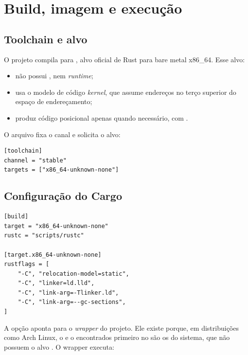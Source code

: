 \chapter{Build, imagem e execu\c{c}\~ao}
\label{cap:build}

\section{Toolchain e alvo}

O projeto compila para , alvo oficial de Rust para
bare metal x86\_64. Esse alvo:

\begin{itemize}
  \item n\~ao possui ,  nem \emph{runtime};
  \item usa o modelo de c\'odigo \emph{kernel}, que assume endere\c{c}os no
        ter\c{c}o superior do espa\c{c}o de endere\c{c}amento;
  \item produz c\'odigo posicional apenas quando necess\'ario, com
        .
\end{itemize}

O arquivo  fixa o canal  e solicita o
alvo:

\begin{lstlisting}[caption={\code{rust-toolchain.toml}.},label={lst:toolchain}]
[toolchain]
channel = "stable"
targets = ["x86_64-unknown-none"]
\end{lstlisting}

\section{Configura\c{c}\~ao do Cargo}

\begin{lstlisting}[caption={\code{.cargo/config.toml}.},label={lst:cargoconfig}]
[build]
target = "x86_64-unknown-none"
rustc = "scripts/rustc"

[target.x86_64-unknown-none]
rustflags = [
    "-C", "relocation-model=static",
    "-C", "linker=ld.lld",
    "-C", "link-arg=-Tlinker.ld",
    "-C", "link-arg=--gc-sections",
]
\end{lstlisting}

A op\c{c}\~ao  aponta para o \emph{wrapper} 
do projeto. Ele existe porque, em distribui\c{c}\~oes como Arch Linux, o
 e o  encontrados primeiro no  s\~ao os do
sistema, que n\~ao possuem o alvo . O wrapper
executa:


